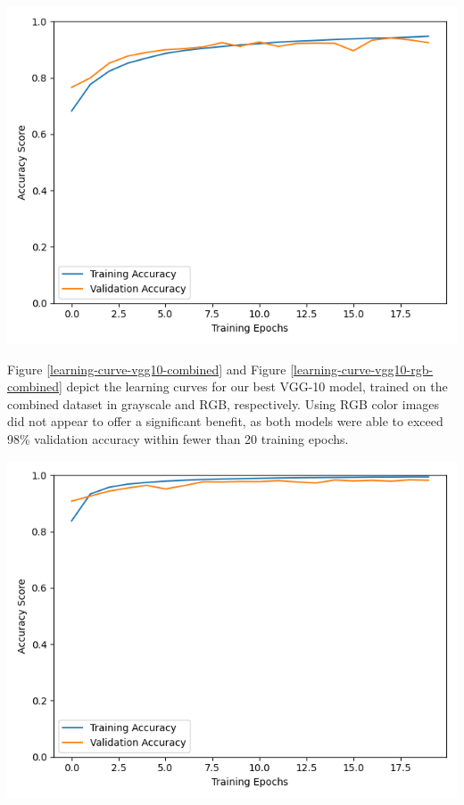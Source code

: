 \documentclass[11pt, letterpaper]{article}
\newenvironment{Figure}
  {\par\medskip\noindent\minipage{\linewidth}}
  {\endminipage\par\medskip}
\begin{document}
\begin{multicols}{2}
  \begin{Figure}
    \centering
    \includegraphics[width=1.0\textwidth]{figures/learning-curve-baseline-cropped-grayscale-noaug.png}
    \label{learning-curve-baseline}
  \end{Figure}

  Figure \ref{learning-curve-vgg10-combined} and Figure
  \ref{learning-curve-vgg10-rgb-combined} depict the learning curves
  for our best VGG-10 model, trained on the combined dataset in
  grayscale and RGB, respectively. Using RGB color images did not appear to offer
  a significant benefit, as both models were able to exceed 98\% validation accuracy
  within fewer than 20 training epochs.

  \begin{Figure}
    \centering
    \includegraphics[width=1.0\textwidth]{figures/learning-curve-vgg10-dlib-hflip-combined-125-0001.png}
    \label{learning-curve-vgg10-combined}
  \end{Figure}


\end{multicols}
\end{document}
